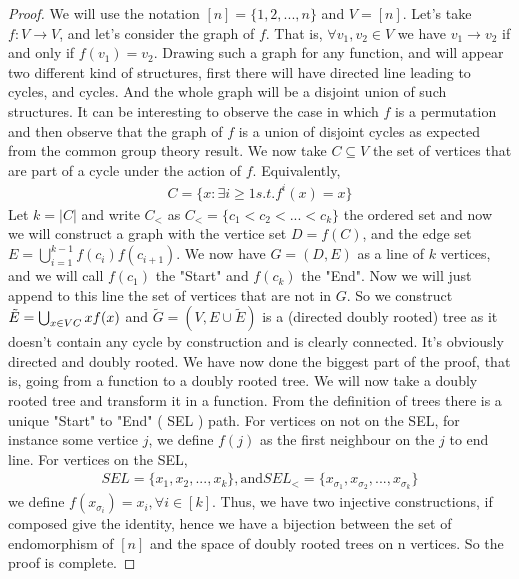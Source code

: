 \begin{proof}
We will use the notation $[n] = \{1, 2, ..., n\}$ and $V = [n]$.
Let's take $f:V \longrightarrow V$, and let's consider the graph of $f$. That is, $\forall v_1, v_2 \in V$ we have $v_1 \rightarrow v_2$ if and only if $f(v_1) = v_2$.
Drawing such a graph for any function, and will appear two different kind of structures, first there will have directed line leading to cycles, and cycles. And the whole graph will be a disjoint union of such structures. It can be interesting to observe the case in which $f$ is a permutation and then observe that the graph of $f$ is a union of disjoint cycles as expected from the common group theory result.
\newline
We now take $C \subseteq V$ the set of vertices that are part of a cycle under the action of $f$. Equivalently,
\begin{align*}
    C = \{ x : \exists i \geq 1 s. t. f^i(x) = x \}
\end{align*}
Let $k = |C|$ and write $C_<$ as $C_< = \{c_1 < c_2 <...<c_k\}$ the ordered set and now we will construct a graph with the vertice set $D = f(C)$, and the edge set $E = \bigcup_{i=1}^{k-1} f(c_i)f(c_{i+1})$. We now have $G=(D, E)$ as a line of $k$ vertices, and we will call $f(c_1)$ the "Start" and $f(c_k)$ the "End".
\newline
Now we will just append to this line the set of vertices that are not in $G$. So we construct $\tilde{E} = \bigcup_{x \in V\\C} x f(x)$ and $\tilde{G} = (V, E\cup\tilde{E})$ is a (directed doubly rooted) tree as it doesn't contain any cycle by construction and is clearly connected. It's obviously directed and  doubly rooted.
We have now done the biggest part of the proof, that is, going from a function to a doubly rooted tree.
\newline
We will now take a doubly rooted tree and transform it in a function. From the definition of trees there is a unique "Start" to "End" ( SEL ) path.
\newline
For vertices on not on the SEL, for instance some vertice $j$, we define $f(j)$ as the first neighbour on the $j$ to end line.
\newline
For vertices on the SEL, 
\begin{align}
    SEL = \{x_1, x_2, ..., x_k\}, \text{and} SEL_< = \{x_{\sigma_1}, x_{\sigma_2}, ..., x_{\sigma_k}\} 
\end{align}
we define $f(x_{\sigma_i}) = x_i, \forall i \in [k]$.
\newline
Thus, we have two injective constructions, if composed give the identity, hence we have a bijection between the set of endomorphism of $[n]$ and the space of doubly rooted trees on n vertices. So the proof is complete.
\end{proof}
